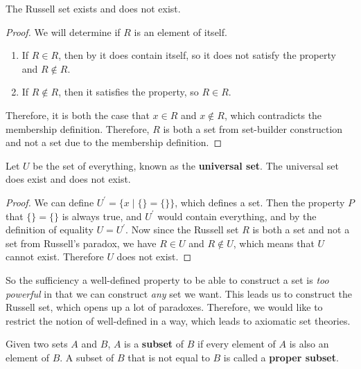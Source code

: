 \documentclass{article}
\begin{document}
    \begin{theorem} 
      The Russell set exists and does not exist. 
    \end{theorem}
    \begin{proof}
      We will determine if $R$ is an element of itself. 
      \begin{enumerate}
        \item If $R \in R$, then by it does contain itself, so it does not satisfy the property and $R \not\in R$. 
        \item If $R \not\in R$, then it satisfies the property, so $R \in R$. 
      \end{enumerate}
      Therefore, it is both the case that $x \in R$ and $x \not\in R$, which contradicts the membership definition. Therefore, $R$ is both a set from set-builder construction and not a set due to the membership definition. 
    \end{proof}

    \begin{theorem}
      Let $U$ be the set of everything, known as the \textbf{universal set}. The universal set does exist and does not exist. 
    \end{theorem}
    \begin{proof}
      We can define $U^\prime = \{x \mid \{\} = \{\} \}$, which defines a set. Then the property $P$ that $\{\} = \{\}$ is always true, and $U^\prime$ would contain everything, and by the definition of equality $U = U^\prime$. Now since the Russell set $R$ is both a set and not a set from Russell's paradox, we have $R \in U$ and $R \not\in U$, which means that $U$ cannot exist. Therefore $U$ does not exist. 
    \end{proof}

    So the sufficiency a well-defined property to be able to construct a set is \textit{too powerful} in that we can construct \textit{any} set we want. This leads us to construct the Russell set, which opens up a lot of paradoxes. Therefore, we would like to restrict the notion of well-defined in a way, which leads to axiomatic set theories. 

    \begin{definition}[Subsets]
      Given two sets $A$ and $B$, $A$ is a \textbf{subset} of $B$ if every element of $A$ is also an element of $B$. A subset of $B$ that is not equal to $B$ is called a \textbf{proper subset}. 
    \end{definition}
\end{document}
